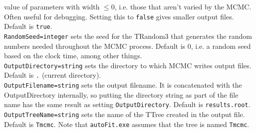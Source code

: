 value of parameters with width $\leq 0$, i.e. those that aren't varied
by the MCMC.  Often useful for debugging.  Setting this to
\verb|false| gives smaller output files.  Default is \verb|true|.\medskip\\
\verb|RandomSeed=integer| sets the seed for the TRandom3 that
generates the random numbers needed throughout the MCMC process.
Default is 0, i.e. a random seed based on the clock time, among other
things.\medskip\\
\verb|OutputDirectory=string| sets the directory to which MCMC writes
output files.  Default is \verb|.| (current directory).\medskip\\
\verb|OutputFilename=string| sets the output filename.  It is
concatenated with the OutputDirectory internally, so putting the
directory string as part of the file name has the same result as
setting
\verb|OutputDirectory|.  Default is \verb|results.root|.\medskip\\
\verb|OutputTreeName=string| sets the name of the TTree created in the
output file.  Default is \verb|Tmcmc|.  Note that \verb|autoFit.exe|
assumes that the tree is named \verb|Tmcmc|.

